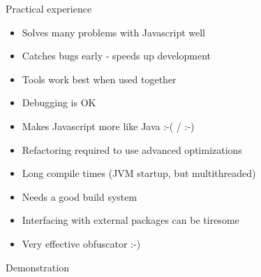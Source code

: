 \documentclass{powerdot}
\begin{document}
\begin{slide}{Practical experience}
\begin{itemize}
\item Solves many problems with Javascript well
\item Catches bugs early - speeds up development
\item Tools work best when used together
\item Debugging is OK
\item Makes Javascript more like Java :-( / :-)
\item Refactoring required to use advanced optimizations
\item Long compile times (JVM startup, but multithreaded)
\item Needs a good build system
\item Interfacing with external packages can be tiresome
\item Very effective obfuscator :-)
\end{itemize}
\end{slide}

\begin{slide}{Demonstration}
 \\
 \\
\end{slide}
\end{document}
